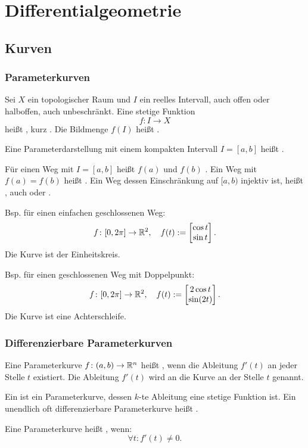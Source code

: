 
\chapter{Differentialgeometrie}
\section{Kurven}
\subsection{Parameterkurven}
 Sei $X$ ein topologischer Raum und
$I$ ein reelles Intervall, auch offen oder halboffen, auch unbeschränkt.
Eine stetige Funktion
\begin{equation}
f\colon I\to X
\end{equation}
heißt , kurz
. Die Bildmenge $f(I)$ heißt .

Eine Parameterdarstellung mit einem kompakten Intervall $I=[a,b]$
heißt .

Für einen Weg mit $I=[a,b]$ heißt $f(a)$ 
und $f(b)$ . Ein Weg mit $f(a)=f(b)$
heißt . Ein Weg dessen Einschränkung auf $[a,b)$
injektiv ist, heißt , auch  oder
.

Bsp. für einen einfachen geschlossenen Weg:
\begin{equation}
f\colon [0,2\pi]\to \mathbb R^2,\quad
f(t):=\begin{bmatrix}
\cos t\\
\sin t
\end{bmatrix}.
\end{equation}
Die Kurve ist der Einheitskreis.

Bsp. für einen geschlossenen Weg mit Doppelpunkt:
\begin{equation}
f\colon [0,2\pi]\to \mathbb R^2,\quad
f(t):=\begin{bmatrix}
2\cos t\\
\sin(2t)
\end{bmatrix}.
\end{equation}
Die Kurve ist eine Achterschleife.

\subsection{Differenzierbare Parameterkurven}
 Eine Parameterkurve $f\colon (a,b)\to\mathbb R^n$ heißt
, wenn die Ableitung $f'(t)$ an jeder Stelle
$t$ existiert. Die Ableitung $f'(t)$ wird
 an die Kurve an der Stelle $t$ genannt.

Ein  ist ein Parameterkurve, dessen $k$-te Ableitung
eine stetige Funktion ist. Ein unendlich oft differenzierbare
Parameterkurve heißt .

Eine Parameterkurve heißt , wenn:
\begin{equation}
\forall t\colon f'(t)\ne 0.
\end{equation}






